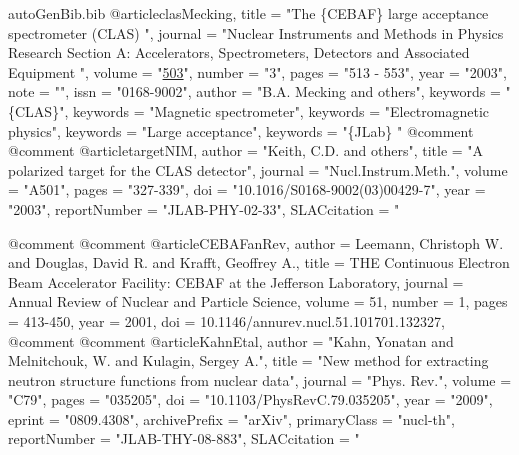 \begin{filecontents*}{autoGenBib.bib}
@article{clasMecking,
title = "The \{CEBAF\} large acceptance spectrometer (CLAS) ",
journal = "Nuclear Instruments and Methods in Physics Research Section A: Accelerators, Spectrometers, Detectors and Associated Equipment ",
volume = "\href{http://www.sciencedirect.com/science/article/pii/S0168900203010015}{503}",
number = "3",
pages = "513 - 553",
year = "2003",
note = "",
issn = "0168-9002",
author = "B.A. Mecking and others",
keywords = "\{CLAS\}",
keywords = "Magnetic spectrometer",
keywords = "Electromagnetic physics",
keywords = "Large acceptance",
keywords = "\{JLab\} "
}
@comment %
@comment %
@article{targetNIM,
      author         = "Keith, C.D. and others",
      title          = "{A polarized target for the CLAS detector}",
      journal        = "Nucl.Instrum.Meth.",
      volume         = "A501",
      pages          = "327-339",
      doi            = "10.1016/S0168-9002(03)00429-7",
      year           = "2003",
      reportNumber   = "JLAB-PHY-02-33",
      SLACcitation   = "%
}

@comment %
@comment %
@article{CEBAFanRev,
author = {Leemann, Christoph W. and Douglas, David R. and Krafft, Geoffrey A.},
title = {THE Continuous Electron Beam Accelerator Facility: CEBAF at the Jefferson Laboratory},
journal = {Annual Review of Nuclear and Particle Science},
volume = {51},
number = {1},
pages = {413-450},
year = {2001},
doi = {10.1146/annurev.nucl.51.101701.132327},
}
@comment %
@comment %
@article{KahnEtal,
      author         = "Kahn, Yonatan and Melnitchouk, W. and Kulagin, Sergey A.",
      title          = "{New method for extracting neutron structure functions from nuclear data}",
      journal        = "Phys. Rev.",
      volume         = "C79",
      pages          = "035205",
      doi            = "10.1103/PhysRevC.79.035205",
      year           = "2009",
      eprint         = "0809.4308",
      archivePrefix  = "arXiv",
      primaryClass   = "nucl-th",
      reportNumber   = "JLAB-THY-08-883",
      SLACcitation   = "%
}


\end{filecontents*}
